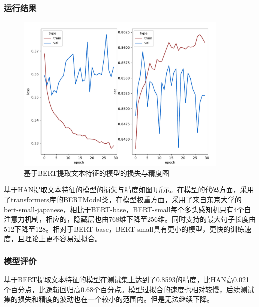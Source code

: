\documentclass[lang=cn,a4paper]{elegantpaper}
\begin{document}
\subsubsection{运行结果}
\begin{figure}[!htbp]
  \centering
  \includegraphics[width=4in]{image/berttrain.pdf}
  \caption{基于BERT提取文本特征的模型的损失与精度图}
  \label{fig:BERT loss}
\end{figure}

基于HAN提取文本特征的模型的损失与精度如图\ref{fig:BERT loss}所示。在模型的代码方面，采用了transformers库的BERTModel类，在模型权重方面，采用了来自东京大学的\href{https://huggingface.co/izumi-lab/bert-small-japanese}{bert-small-japanese}，相比于BERT-base，BERT-small每个多头感知机只有4个自注意力机制，相应的，隐藏层也由768维下降至256维。同时支持的最大句子长度由512下降至128。相对于BERT-base，BERT-small具有更小的模型，更快的训练速度，且理论上更不容易过拟合。

\subsubsection{模型评价}
基于BERT提取文本特征的模型在测试集上达到了0.8593的精度，比HAN高0.021个百分点，比逻辑回归高0.68个百分点。模型过拟合的速度也相对较慢，后续测试集的损失和精度的波动也在一个较小的范围内。但是无法继续下降。
\end{document}
